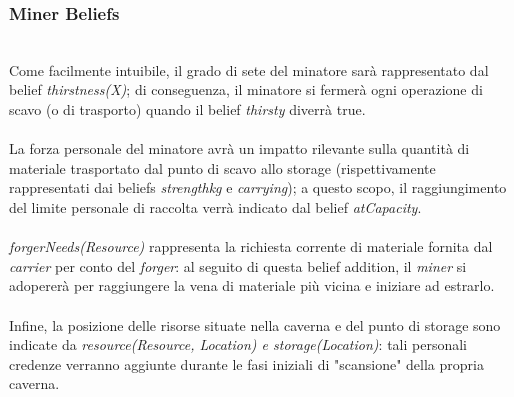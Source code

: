 \documentclass{llncs}
\begin{document}
\subsubsection{Miner Beliefs}~
\\
Come facilmente intuibile, il grado di sete del minatore sarà rappresentato dal belief \textit{thirstness(X)}; di conseguenza, il minatore si fermerà ogni operazione di scavo (o di trasporto) quando il belief \textit{thirsty} diverrà true.\\\\
La forza personale del minatore avrà un impatto rilevante sulla quantità di materiale trasportato dal punto di scavo allo storage (rispettivamente rappresentati dai beliefs \textit{strength\textunderscore kg} e \textit{carrying}); a questo scopo, il raggiungimento del limite personale di raccolta verrà indicato dal belief \textit{atCapacity}.\\\\
\textit{forgerNeeds(Resource)} rappresenta la richiesta corrente di materiale fornita dal \textit{ carrier} per conto del \textit{forger}: al seguito di questa belief addition, il \textit{miner} si adopererà per raggiungere la vena di materiale più vicina e iniziare ad estrarlo.\\\\
Infine, la posizione delle risorse situate nella caverna e del punto di storage sono indicate da \textit{resource(Resource, Location) e storage(Location)}: tali personali credenze verranno aggiunte durante le fasi iniziali di "scansione" della propria caverna.
\end{document}
